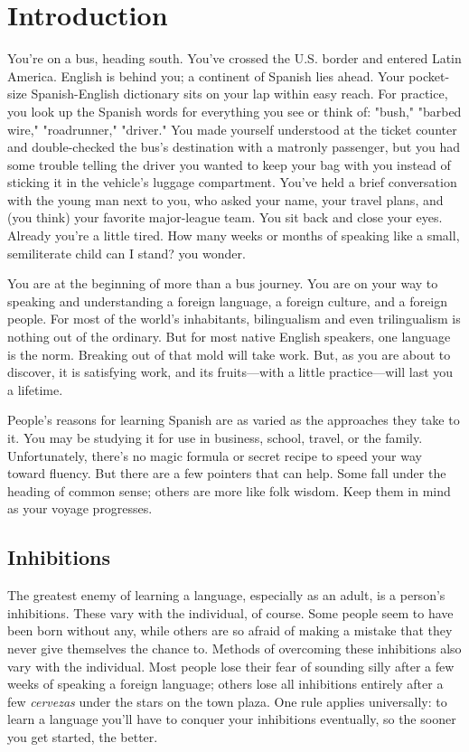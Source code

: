 \chapter{Introduction}

You're on a bus, heading south. You've crossed the U.S. border
and entered Latin America. English is behind you; a continent of Spanish lies ahead. Your pocket-size Spanish-English dictionary sits on your
lap within easy reach. For practice, you look up the Spanish words for
everything you see or think of: "bush," "barbed wire," "roadrunner,"
"driver." You made yourself understood at the ticket counter and
double-checked the bus's destination with a matronly passenger, but
you had some trouble telling the driver you wanted to keep your bag
with you instead of sticking it in the vehicle's luggage compartment.
You've held a brief conversation with the young man next to you,
who asked your name, your travel plans, and (you think) your favorite
major-league team. You sit back and close your eyes. Already you're a
little tired. How many weeks or months of speaking like a small, semiliterate child can I stand? you wonder.

You are at the beginning of more than a bus journey. You are
on your way to speaking and understanding a foreign language, a foreign culture, and a foreign people. For most of the world's inhabitants,
bilingualism and even trilingualism is nothing out of the ordinary. But
for most native English speakers, one language is the norm. Breaking
out of that mold will take work. But, as you are about to discover, it is
satisfying work, and its fruits---with a little practice---will last you a
lifetime.

People's reasons for learning Spanish are as varied as the approaches they take to it. You may be studying it for use in business,
school, travel, or the family. Unfortunately, there's no magic formula
or secret recipe to speed your way toward fluency. But there are a few
pointers that can help. Some fall under the heading of common sense;
others are more like folk wisdom. Keep them in mind as your voyage
progresses.

\section{Inhibitions}

The greatest enemy of learning a language, especially as an
adult, is a person's inhibitions. These vary with the individual, of
course. Some people seem to have been born without any, while others are so afraid of making a mistake that they never give themselves
the chance to. Methods of overcoming these inhibitions also vary with
the individual. Most people lose their fear of sounding silly after a few
weeks of speaking a foreign language; others lose all inhibitions entirely after a few \emph{cervezas} under the stars on the town plaza. One rule
applies universally: to learn a language you'll have to conquer your inhibitions eventually, so the sooner you get started, the better.


